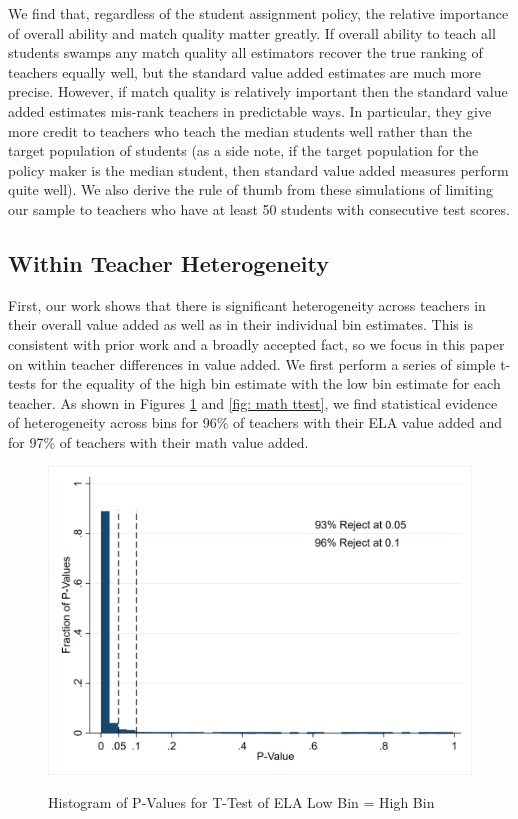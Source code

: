 \documentclass[letterpaper,12pt]{article}
\begin{document}
We find that, regardless of the student assignment policy, the relative importance of overall ability and match quality matter greatly. If overall ability to teach all students swamps any match quality all estimators recover the true ranking of teachers equally well, but the standard value added estimates are much more precise. However, if match quality is relatively important then the standard value added estimates mis-rank teachers in predictable ways. In particular, they give more credit to teachers who teach the median students well rather than the target population of students (as a side note, if the target population for the policy maker is the median student, then standard value added measures perform quite well). We also derive the rule of thumb from these simulations of limiting our sample to teachers who have at least 50 students with consecutive test scores.


\subsection{Within Teacher Heterogeneity}

First, our work shows that there is significant heterogeneity across teachers in their overall value added as well as in their individual bin estimates. This is consistent with prior work and a broadly accepted fact, so we focus in this paper on within teacher differences in value added. We first perform a series of simple t-tests for the equality of the high bin estimate with the low bin estimate for each teacher. As shown in Figures \ref{fig: ELA ttest} and \ref{fig: math ttest}, we find statistical evidence of heterogeneity across bins for 96\% of teachers with their ELA value added and for 97\% of teachers with their math value added. 

\begin{figure}[ht]
    \centering
    \caption{Histogram of P-Values for T-Test of ELA Low Bin = High Bin}
    \includegraphics[width=\textwidth]{figures/ELA_T_Test_Hist.png}
    \label{fig: ELA ttest}
\end{figure}
\end{document}
